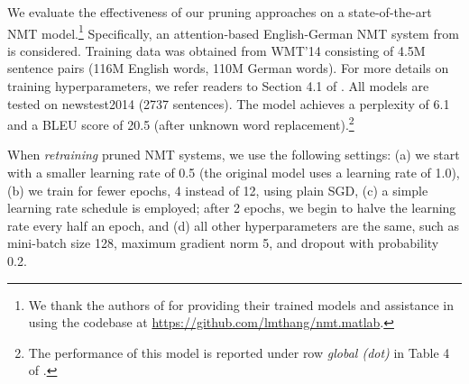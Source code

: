 
We evaluate the effectiveness of our pruning approaches on a state-of-the-art
NMT model.\footnote{We thank the authors of \cite{luong2015effective}
for providing their trained models and assistance in using the codebase
at \url{https://github.com/lmthang/nmt.matlab}.} 
Specifically, an attention-based English-German NMT system from
\cite{luong2015effective} is considered. 
Training data was obtained from WMT'14 consisting
of 4.5M sentence pairs (116M English words, 110M German words). For
more details on training hyperparameters, we refer readers to Section 4.1 of
\cite{luong2015effective}.
All models are tested on newstest2014 (2737 sentences). 
The model achieves a
perplexity of 6.1 and a BLEU score of
20.5 (after unknown word replacement).\footnote{The performance of this model
is reported under row {\it global (dot)} in Table 4 of
\cite{luong2015effective}.}

When {\it retraining} pruned NMT systems, we use the following settings: (a) we start
with a smaller learning rate of 0.5 (the original model uses a learning rate of
1.0), (b) we train for fewer epochs, 4 instead of 12, using plain SGD, (c) a simple learning
rate schedule is employed; after 2 epochs, we begin to halve the learning rate
every half an epoch, and (d) all other hyperparameters are the same, such as
mini-batch size 128, maximum gradient norm 5, and dropout with probability 0.2.